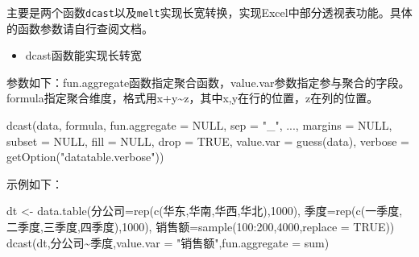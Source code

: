 \documentclass[
]{book}
\newenvironment{Shaded}{\begin{snugshade}}{\end{snugshade}}
\newcommand{\AttributeTok}[1]{\textcolor[rgb]{0.77,0.63,0.00}{#1}}
\newcommand{\ConstantTok}[1]{\textcolor[rgb]{0.00,0.00,0.00}{#1}}
\newcommand{\DecValTok}[1]{\textcolor[rgb]{0.00,0.00,0.81}{#1}}
\newcommand{\FunctionTok}[1]{\textcolor[rgb]{0.00,0.00,0.00}{#1}}
\newcommand{\NormalTok}[1]{#1}
\newcommand{\OtherTok}[1]{\textcolor[rgb]{0.56,0.35,0.01}{#1}}
\newcommand{\SpecialCharTok}[1]{\textcolor[rgb]{0.00,0.00,0.00}{#1}}
\newcommand{\StringTok}[1]{\textcolor[rgb]{0.31,0.60,0.02}{#1}}
\providecommand{\tightlist}{%
  \setlength{\itemsep}{0pt}\setlength{\parskip}{0pt}}
\begin{document}
主要是两个函数\texttt{dcast}以及\texttt{melt}实现长宽转换，实现Excel中部分透视表功能。具体的函数参数请自行查阅文档。

\begin{itemize}
\tightlist
\item
  dcast函数能实现长转宽
\end{itemize}

参数如下：fun.aggregate函数指定聚合函数，value.var参数指定参与聚合的字段。formula指定聚合维度，格式用x+y\textasciitilde z，其中x,y在行的位置，z在列的位置。

\begin{Shaded}
\begin{Highlighting}[]
\FunctionTok{dcast}\NormalTok{(data, formula, }\AttributeTok{fun.aggregate =} \ConstantTok{NULL}\NormalTok{, }\AttributeTok{sep =} \StringTok{"\_"}\NormalTok{,}
\NormalTok{    ..., }\AttributeTok{margins =} \ConstantTok{NULL}\NormalTok{, }\AttributeTok{subset =} \ConstantTok{NULL}\NormalTok{, }\AttributeTok{fill =} \ConstantTok{NULL}\NormalTok{,}
    \AttributeTok{drop =} \ConstantTok{TRUE}\NormalTok{, }\AttributeTok{value.var =} \FunctionTok{guess}\NormalTok{(data),}
    \AttributeTok{verbose =} \FunctionTok{getOption}\NormalTok{(}\StringTok{"datatable.verbose"}\NormalTok{))}
\end{Highlighting}
\end{Shaded}

示例如下：

\begin{Shaded}
\begin{Highlighting}[]
\NormalTok{dt }\OtherTok{\textless{}{-}} \FunctionTok{data.table}\NormalTok{(分公司}\OtherTok{=}\FunctionTok{rep}\NormalTok{(}\FunctionTok{c}\NormalTok{(}\StringTok{\textquotesingle{}华东\textquotesingle{}}\NormalTok{,}\StringTok{\textquotesingle{}华南\textquotesingle{}}\NormalTok{,}\StringTok{\textquotesingle{}华西\textquotesingle{}}\NormalTok{,}\StringTok{\textquotesingle{}华北\textquotesingle{}}\NormalTok{),}\DecValTok{1000}\NormalTok{),}
\NormalTok{              季度}\OtherTok{=}\FunctionTok{rep}\NormalTok{(}\FunctionTok{c}\NormalTok{(}\StringTok{\textquotesingle{}一季度\textquotesingle{}}\NormalTok{,}\StringTok{\textquotesingle{}二季度\textquotesingle{}}\NormalTok{,}\StringTok{\textquotesingle{}三季度\textquotesingle{}}\NormalTok{,}\StringTok{\textquotesingle{}四季度\textquotesingle{}}\NormalTok{),}\DecValTok{1000}\NormalTok{),}
\NormalTok{              销售额}\OtherTok{=}\FunctionTok{sample}\NormalTok{(}\DecValTok{100}\SpecialCharTok{:}\DecValTok{200}\NormalTok{,}\DecValTok{4000}\NormalTok{,}\AttributeTok{replace =} \ConstantTok{TRUE}\NormalTok{))}
\FunctionTok{dcast}\NormalTok{(dt,分公司}\SpecialCharTok{\textasciitilde{}}\NormalTok{季度,}\AttributeTok{value.var =} \StringTok{"销售额"}\NormalTok{,}\AttributeTok{fun.aggregate =}\NormalTok{ sum)}
\end{Highlighting}
\end{Shaded}
\end{document}
